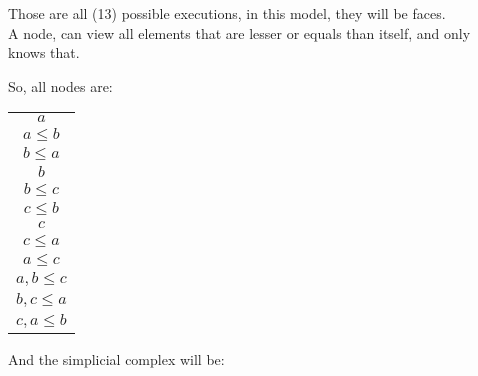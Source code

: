 \documentclass[oneside,openany]{tufte-book} %
\begin{document}
Those are all (13) possible executions, in this model, they will be faces.\\
A node, can view all elements that are lesser or equals than itself, and only knows that.

So, all nodes are:
\begin{tabular}{ c}
  \hline                       
$a$ \\
$a \le b$ \\
$b \le a$ \\
$b$ \\
$b \le c$ \\
$c \le b$ \\
$c$ \\
$c \le a$ \\
$a \le c$ \\
$ {a,b} \le c$ \\
$ {b,c} \le a$ \\
$ {c,a} \le b$ \\
  \hline  
\end{tabular}


And the simplicial complex will be:
\end{document}
